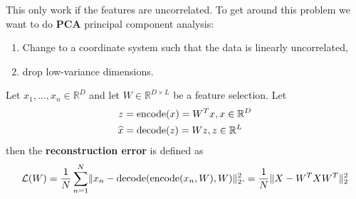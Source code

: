 \documentclass[12 pt]{article}        	%
\begin{document}
This only work if the features are uncorrelated.
To get around this problem we want to do \textbf{PCA} principal component analysis:
\begin{enumerate}
    \item 
    Change to a coordinate system such that the data is linearly uncorrelated,

    \item 
    drop low-variance dimensions.
\end{enumerate}

\begin{defi}
\label{reconstruction_error}
    Let $ x_1, \dotsc , x_n \in \mathbb{ R }^D $ and let $ W \in \mathbb{ R }^{ D \times L } $ be a feature selection.
    Let 
    \begin{align*}
        z &= \operatorname{encode} ( x ) =  W^T x , x \in \mathbb{ R }^D
        \\
        \widehat{ x } &= \operatorname{decode}( z ) = W z  , z \in \mathbb{ R }^L
    \end{align*}
    then the \textbf{reconstruction error} is defined as 
    \[
        \mathcal{ L } ( W ) 
        =
        \frac{ 1 }{ N } \sum_{ n = 1 }^N \lVert x_n - \operatorname{decode} ( \operatorname{encode} ( x_n , W ) , W ) \rVert_2^2.
        =
        \frac{ 1 }{ N } \lVert X - W^T X W^T \rVert_2^2
    \]
\end{defi}
\end{document}
